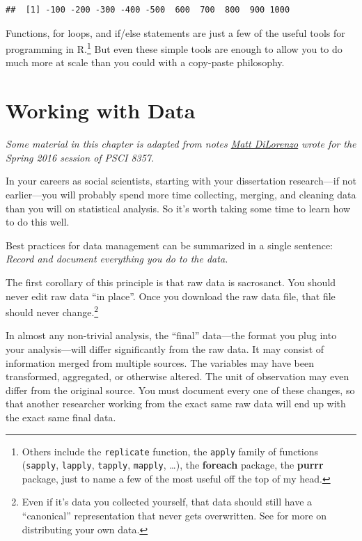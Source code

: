 \documentclass[12pt,oneside,openany]{book}
\begin{document}
\begin{verbatim}
##  [1] -100 -200 -300 -400 -500  600  700  800  900 1000
\end{verbatim}

Functions, for loops, and if/else statements are just a few of the
useful tools for programming in R.\footnote{Others include the
  \texttt{replicate} function, the \texttt{apply} family of functions
  (\texttt{sapply}, \texttt{lapply}, \texttt{tapply}, \texttt{mapply},
  \ldots{}), the \textbf{foreach} package, the \textbf{purrr} package,
  just to name a few of the most useful off the top of my head.} But
even these simple tools are enough to allow you to do much more at scale
than you could with a copy-paste philosophy.

\chapter{Working with Data}\label{data}

\emph{Some material in this chapter is adapted from notes
\href{http://mdilorenzo.github.io}{Matt DiLorenzo} wrote for the Spring
2016 session of PSCI 8357.}

In your careers as social scientists, starting with your dissertation
research---if not earlier---you will probably spend more time
collecting, merging, and cleaning data than you will on statistical
analysis. So it's worth taking some time to learn how to do this well.

Best practices for data management can be summarized in a single
sentence: \emph{Record and document everything you do to the data.}

The first corollary of this principle is that raw data is sacrosanct.
You should never edit raw data ``in place''. Once you download the raw
data file, that file should never change.\footnote{Even if it's data you
  collected yourself, that data should still have a ``canonical''
  representation that never gets overwritten. See \citet{Leek:2015uw}
  for more on distributing your own data.}

In almost any non-trivial analysis, the ``final'' data---the format you
plug into your analysis---will differ significantly from the raw data.
It may consist of information merged from multiple sources. The
variables may have been transformed, aggregated, or otherwise altered.
The unit of observation may even differ from the original source. You
must document every one of these changes, so that another researcher
working from the exact same raw data will end up with the exact same
final data.
\end{document}
